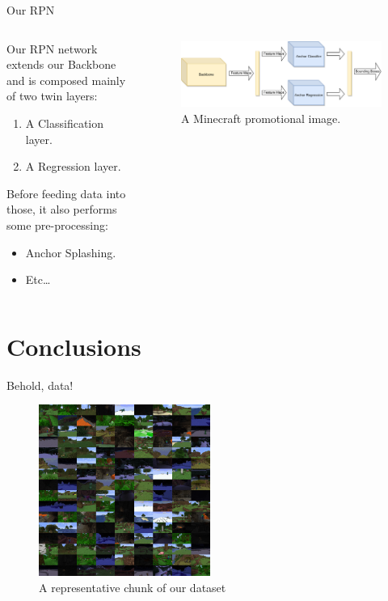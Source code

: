 \documentclass[english]{beamer}
\begin{document}
\begin{frame}{Our RPN}
  \begin{columns}
    
    \begin{column}{0.5\textwidth}
      Our RPN network extends our Backbone and is composed mainly of two twin layers:
      \begin{enumerate}
        \item A Classification layer.
        \item A Regression layer.
      \end{enumerate}
      Before feeding data into those, it also performs some pre-processing:
      \begin{itemize}
        \item Anchor Splashing.
        \item Etc\dots
      \end{itemize}
    \end{column}

    \begin{column}{0.5\textwidth}
      \begin{figure}
        \centering
            \includegraphics[width=1.0\textwidth]{images/network.pdf}
            \caption{A Minecraft promotional image.}
        \end{figure}
    \end{column}

  \end{columns}
\end{frame}

\section{Conclusions}
\begin{frame}{Behold, data!}
  \begin{figure}[h]
      \centering
      \includegraphics[width=0.5\textwidth]{../images/dtset_repr.png}
      \caption{A representative chunk of our dataset}
  \end{figure}
\end{frame}
\end{document}
